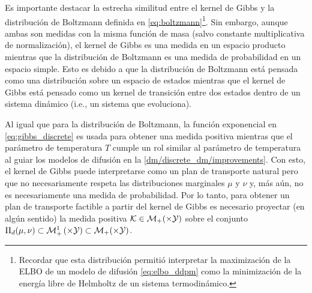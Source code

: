 
Es importante destacar la estrecha similitud entre el kernel de Gibbs y la distribución de Boltzmann definida en \eqref{eq:boltzmann}\footnote{Recordar que esta distribución permitió interpretar la maximización de la ELBO de un modelo de difusión \eqref{eq:elbo_ddpm} como la minimización de la energía libre de Helmholtz de un sistema termodinámico.}. Sin embargo, aunque ambas son medidas con la misma función de masa (salvo constante multiplicativa de normalización), el kernel de Gibbs es una medida en un espacio producto mientras que la distribución de Boltzmann es una medida de probabilidad en un espacio simple. Esto es debido a que la distribución de Boltzmann está pensada como una distribución sobre un espacio de estados mientras que el kernel de Gibbs está pensado como un kernel de transición entre dos estados dentro de un sistema dinámico (i.e., un sistema que evoluciona).

Al igual que para la distribución de Boltzmann, la función exponencial en \eqref{eq:gibbs_discrete} es usada para obtener una medida positiva mientras que el parámetro de temperatura $T$ cumple un rol similar al parámetro de temperatura al guiar los modelos de difusión en la \autoref{dm/discrete_dm/improvements}. Con esto, el kernel de Gibbs puede interpretarse como un plan de transporte natural pero que no necesariamente respeta las distribuciones marginales $\mu$ y $\nu$ y, más aún, no es necesariamente una medida de probabilidad. Por lo tanto, para obtener un plan de transporte factible a partir del kernel de Gibbs es necesario proyectar (en algún sentido) la medida positiva $\mathcal{K}\in\mathcal{M}_+(\times\mathcal{Y})$ sobre el conjunto $\Pi_d(\mu,\nu)\subset\probmeasure{\xspace\times\yspace}\subset\mathcal{M}_+(\xspace\times\yspace)$.

